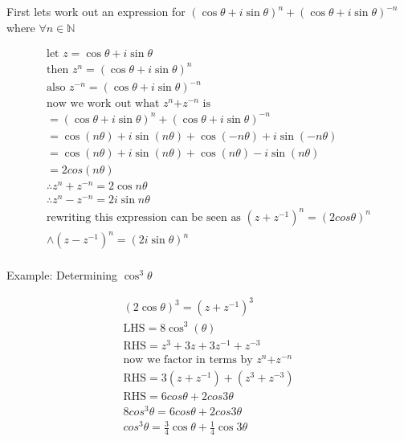 First lets work out an expression for $(\cos{\theta}+i\sin{\theta})^n+ (\cos{\theta}+i\sin{\theta})^{-n}$ where $\forall{n} \in \mathbb{N}$ 

\begin{equation}
    \begin{split}
        \text{let $z=\cos{\theta}+i\sin{\theta}$} \\
        \text{then $z^n=(\cos{\theta}+i\sin{\theta})^n$} \\
        \text{also $z^{-n}=(\cos{\theta}+i\sin{\theta})^{-n}$} \\                            
        \text{now we work out what $z^n$+$z^{-n}$ is} \\
        = (\cos{\theta}+i\sin{\theta})^n+ (\cos{\theta}+i\sin{\theta})^{-n} \\        
        = \cos{(n\theta)}+i\sin{(n\theta)}+\cos{(-n\theta)}+i\sin{(-n\theta)} \\
        = \cos{(n\theta)}+i\sin{(n\theta)}+\cos{(n\theta)}-i\sin{(n\theta)} \\
        = 2cos{(n\theta)} \\
        \therefore z^{n}+z^{-n} = 2\cos{n\theta} \\
        \therefore z^{n}-z^{-n} = 2i\sin{n\theta} \\
        \text{rewriting this expression can be seen as $(z+z^{-1})^n = (2cos\theta)^n$}\\        
        \land (z-z^{-1})^n = (2i\sin{\theta})^n \\ 
    \end{split}
\end{equation}

Example: Determining $\cos^3{\theta}$

\begin{equation}
    \begin{split}
        (2\cos{\theta})^3 = (z+z^{-1})^3 \\
        \text{LHS} = 8\cos^3{(\theta)} \\
        \text{RHS} = z^3+3z+3z^{-1}+z^{-3} \\
        \text{now we factor in terms by $z^n$+$z^{-n}$} \\ 
        \text{RHS} = 3(z+z^{-1}) + (z^{3}+z^{-3}) \\
        \text{RHS} = 6cos{\theta}+2cos{3\theta} \\
        8cos^{3}\theta = 6cos{\theta}+2cos{3\theta} \\
        cos^{3}\theta = \frac{3}{4}\cos{\theta}+\frac{1}{4}\cos{3\theta} \\
    \end{split}
\end{equation}

